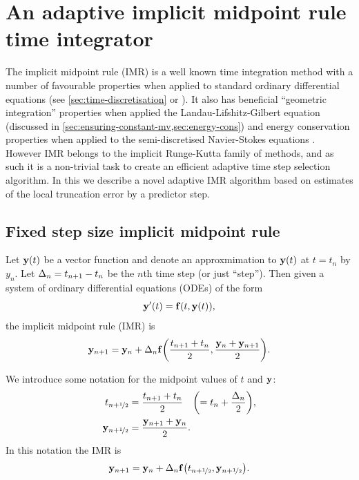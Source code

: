 

\chapter{An adaptive implicit midpoint rule time integrator}
\label{sec:adaptive-imr}


The implicit midpoint rule (IMR) is a well known time integration method with a number of favourable properties when applied to standard ordinary differential equations (see \cref{sec:time-discretisation} or \cite[204]{HairerNorsettWanner}).
It also has beneficial ``geometric integration'' properties when applied the Landau-Lifshitz-Gilbert equation (discussed in \cref{sec:ensuring-constant-mv,sec:energy-cons}) and energy conservation properties when applied to the semi-discretised Navier-Stokes equations \cite{Sanderse2013}.
However IMR belongs to the implicit Runge-Kutta family of methods, and as such it is a non-trivial task to create an efficient adaptive time step selection algorithm.
In this \secpaper{} we describe a novel adaptive IMR algorithm based on estimates of the local truncation error by a predictor step.


\section{Fixed step size implicit midpoint rule}
\label{sec:fixed-step-implicit}

Let $\mathbf{y}(t)$ be a vector function and denote an approxmimation to $\mathbf{y}(t)$ at $t = t_n$ by $y_n$.
Let $\Delta_{n} = t_{n+1} - t_n$ be the $n$th time step (or just ``step'').
Then given a system of ordinary differential equations (ODEs) of the form
\begin{equation}
  \mathbf{y}'(t) = {\mathbf{f}{\left( t, \mathbf{y}(t) \right)}},
  \label{eq:43}
\end{equation}
the implicit midpoint rule (IMR) is
\begin{equation}
    \mathbf{y}_{n+1} = \mathbf{y}_n + \Delta_{n} {\mathbf{f}{\left( \frac{t_{n+1} + t_n}{2}, \frac{\mathbf{y}_n + \mathbf{y}_{n+1}}{2} \right)}}.
\end{equation}

We introduce some notation for the midpoint values of $t$ and $\mathbf{y}$:
\begin{equation}
  \begin{aligned}
    t_{n+\nicefrac{1}{2}} & = \frac{t_{n+1} + t_n}{2} \quad {\left( = t_n + \frac{\Delta_{n}}{2} \right)}, \\
    \mathbf{y}_{n+\nicefrac{1}{2}} &= \frac{\mathbf{y}_{n+1} + \mathbf{y}_n}{2}.
  \end{aligned}
\end{equation}
In this notation the IMR is
\begin{equation}
  \mathbf{y}_{n+1} = \mathbf{y}_n + \Delta_{n} {\mathbf{f}{\left( t_{n+\nicefrac{1}{2}}, \mathbf{y}_{n+\nicefrac{1}{2}} \right)}}.
  \label{eq:basic-midpoint}
\end{equation}

